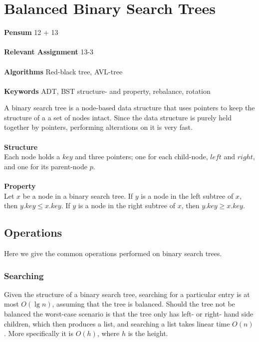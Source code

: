 
\chapter{Balanced Binary Search Trees}
\label{ch:balancedbinarysearchtrees}

\textbf{Pensum} 12 + 13 \cite{clrs} \\\\
\textbf{Relevant Assignment} 13-3 \\\\
\textbf{Algorithms} Red-black tree, AVL-tree \\\\
\textbf{Keywords} ADT, BST structure- and property, rebalance, rotation
\vspace{1in}

\noindent A binary search tree is a node-based data structure that uses
pointers to keep the structure of a a set of nodes intact. Since the data
structure is purely held together by pointers, performing alterations on it
is very fast.
\\\\
\noindent \textbf{Structure} \\
Each node holds a $key$ and three pointers; one for each child-node, $left$
and $right$, and one for its parent-node $p$.
\\\\
\noindent \textbf{Property} \\
Let $x$ be a node in a binary search tree. If $y$ is a node in the left
subtree of $x$, then $y.key \leq x.key$. If $y$ is a node in the right
subtree of $x$, then $y.key \geq x.key$.

\newpage
\section{Operations}
Here we give the common operations performed on binary search trees.

\subsection{Searching}
Given the structure of a binary search tree, searching for a particular entry
is at most $O(\lg n)$, assuming that the tree is balanced. Should the tree not
be balanced the worst-case scenario is that the tree only has left- or right-
hand side children, which then produces a list, and searching a list takes
linear time $O(n)$. More specifically it is $O(h)$, where $h$ is the height.

